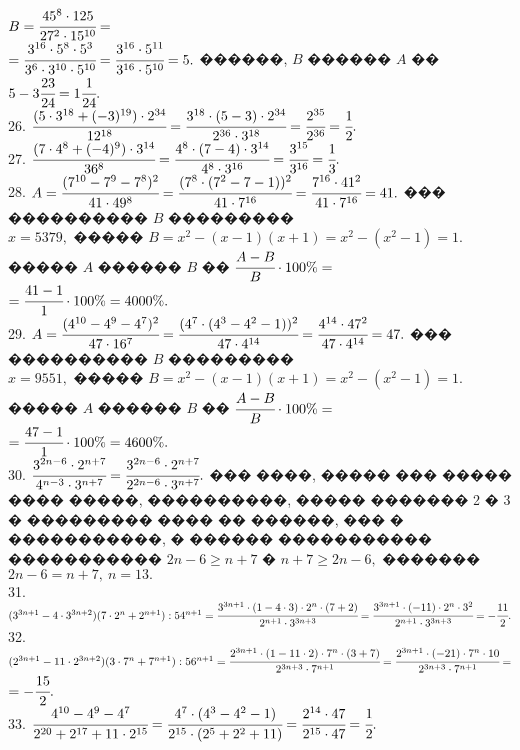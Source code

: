 \documentclass[12pt]{article}
\begin{document}
$B=\cfrac{45^8\cdot125}{27^2\cdot15^{10}}=$\\$=\cfrac{3^{16}\cdot5^{8}\cdot5^3}{3^6\cdot3^{10}\cdot5^{10}}=\cfrac{3^{16}\cdot5^{11}}{3^{16}\cdot5^{10}}=5.$ ������, $B$ ������ $A$ �� $5-3\cfrac{23}{24}=1\cfrac{1}{24}.$\\
26. $\cfrac{(5\cdot3^{18}+(-3)^{19})\cdot2^{34}}{12^{18}}=\cfrac{3^{18}\cdot(5-3)\cdot2^{34}}{2^{36}\cdot3^{18}}=\cfrac{2^{35}}{2^{36}}=\cfrac{1}{2}.$\\
27. $\cfrac{(7\cdot4^8+(-4)^9)\cdot3^{14}}{36^8}=\cfrac{4^8\cdot(7-4)\cdot3^{14}}{4^8\cdot3^{16}}=\cfrac{3^{15}}{3^{16}}=\cfrac{1}{3}.$\\
28. $A=\cfrac{(7^{10}-7^9-7^8)^2}{41\cdot49^8}=\cfrac{(7^8\cdot(7^2-7-1))^2}{41\cdot7^{16}}=\cfrac{7^{16}\cdot41^2}{41\cdot7^{16}}=41.$ ��� ���������� $B$ ���������\\ $x=5379,$ ����� $B=x^2-(x-1)(x+1)=x^2-(x^2-1)=1.$ ����� $A$ ������ $B$ �� $\cfrac{A-B}{B}\cdot100\%=$\\$=\cfrac{41-1}{1}\cdot100\%=4000\%.$\\
29. $A=\cfrac{(4^{10}-4^9-4^7)^2}{47\cdot16^7}=\cfrac{(4^7\cdot(4^3-4^2-1))^2}{47\cdot4^{14}}=\cfrac{4^{14}\cdot47^2}{47\cdot4^{14}}=47.$ ��� ���������� $B$ ���������\\ $x=9551,$ ����� $B=x^2-(x-1)(x+1)=x^2-(x^2-1)=1.$ ����� $A$ ������ $B$ �� $\cfrac{A-B}{B}\cdot100\%=$\\$=\cfrac{47-1}{1}\cdot100\%=4600\%.$\\
30. $\cfrac{3^{2n-6}\cdot2^{n+7}}{4^{n-3}\cdot3^{n+7}}=\cfrac{3^{2n-6}\cdot2^{n+7}}{2^{2n-6}\cdot3^{n+7}}.$ ��� ����, ����� ��� ����� ���� �����, ����������, ����� ������� 2 � 3 � ��������� ���� �� ������, ��� � �����������, � ������ ����������� ����������� $2n-6\geqslant n+7$ � $n+7\geqslant 2n-6,$ ������� $2n-6=n+7,\ n=13.$\\
31. $(3^{3n+1}-4\cdot3^{3n+2})(7\cdot2^n+2^{n+1}):54^{n+1}=\cfrac{3^{3n+1}\cdot(1-4\cdot3)\cdot2^n\cdot(7+2)}{2^{n+1}\cdot3^{3n+3}}=
\cfrac{3^{3n+1}\cdot(-11)\cdot2^n\cdot3^2}{2^{n+1}\cdot3^{3n+3}}=-\cfrac{11}{2}.$\\
32. $(2^{3n+1}-11\cdot2^{3n+2})(3\cdot7^n+7^{n+1}):56^{n+1}=\cfrac{2^{3n+1}\cdot(1-11\cdot2)\cdot7^n\cdot(3+7)}{2^{3n+3}\cdot7^{n+1}}=
\cfrac{2^{3n+1}\cdot(-21)\cdot7^n\cdot10}{2^{3n+3}\cdot7^{n+1}}=$\\$=-\cfrac{15}{2}.$\\
33. $\cfrac{4^{10}-4^9-4^7}{2^{20}+2^{17}+11\cdot2^{15}}=\cfrac{4^7\cdot(4^3-4^2-1)}{2^{15}\cdot(2^5+2^2+11)}=
\cfrac{2^{14}\cdot47}{2^{15}\cdot47}=\cfrac{1}{2}.$\\
\end{document}
